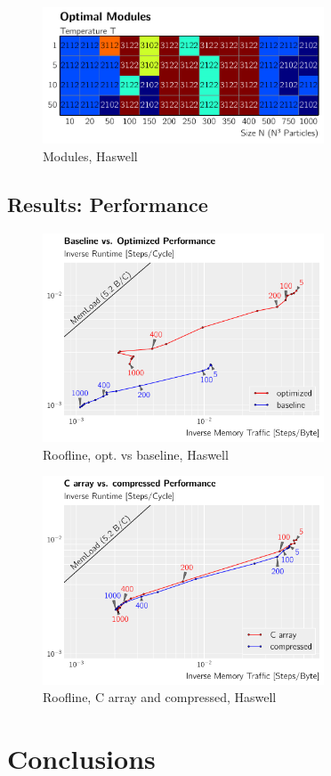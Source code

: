 \documentclass[letterpaper]{article}
\begin{document}
	\begin{figure}[h]\centering
		  \includegraphics[width = 8.36cm]{plots/module_dg2.pdf}
		  \caption{Modules, Haswell}
	\end{figure}
	

\subsection{Results: Performance}
	\begin{figure}[h]\centering
		  \includegraphics[width = 8.36cm]{plots/roofline_0.pdf}
		  \caption{Roofline, opt. vs baseline, Haswell}
	\end{figure}
	\begin{figure}[h]\centering
		  \includegraphics[width = 8.36cm]{plots/roofline_1.pdf}
		  \caption{Roofline, C array and compressed, Haswell}
	\end{figure}

\section{Conclusions}



\end{document}

